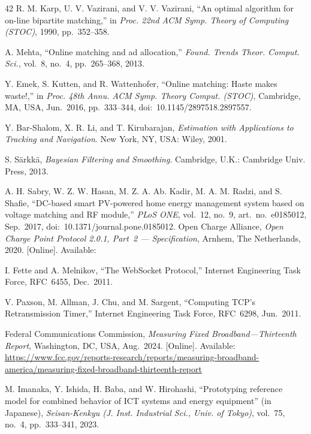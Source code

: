 \documentclass{ieeeaccess}
\newif\ifhighlight \highlightfalse
\DeclareRobustCommand{\revised}[1]{\ifhighlight{\color{blue}#1}\else{\color{.}#1}\fi}
\begin{document}
\begin{thebibliography}{42}
         R. M. Karp, U. V. Vazirani, and V. V. Vazirani, ``An optimal algorithm for on-line bipartite matching,'' in \textit{Proc. 22nd ACM Symp. Theory of Computing (STOC)}, 1990, pp.~352--358.

         A. Mehta, ``Online matching and ad allocation,'' \textit{Found. Trends Theor. Comput. Sci.}, vol.~8, no.~4, pp.~265--368, 2013.

         Y. Emek, S. Kutten, and R. Wattenhofer, ``Online matching: Haste makes waste!,'' in \textit{Proc. 48th Annu. ACM Symp. Theory Comput. (STOC)}, Cambridge, MA, USA, Jun.~2016, pp.~333--344, doi:~10.1145/2897518.2897557.

         Y. Bar-Shalom, X. R. Li, and T. Kirubarajan, \textit{Estimation with Applications to Tracking and Navigation}. New York, NY, USA: Wiley, 2001.

         S. S\"{a}rkk\"{a}, \textit{Bayesian Filtering and Smoothing}. Cambridge, U.K.: Cambridge Univ. Press, 2013.

         \revised{A. H. Sabry, W. Z. W. Hasan, M. Z. A. Ab. Kadir, M. A. M. Radzi, and S. Shafie, ``DC-based smart PV-powered home energy management system based on voltage matching and RF module,'' \textit{PLoS ONE}, vol.~12, no.~9, art.~no.~e0185012, Sep.~2017, doi:~10.1371/journal.pone.0185012.}
         Open Charge Alliance, \textit{Open Charge Point Protocol 2.0.1, Part~2 --- Specification}, Arnhem, The Netherlands, 2020. [Online]. Available: \revised{\urlocpp}

         I. Fette and A. Melnikov, ``The WebSocket Protocol,'' Internet Engineering Task Force, RFC~6455, Dec.~2011.

         V. Paxson, M. Allman, J. Chu, and M. Sargent, ``Computing TCP's Retransmission Timer,'' Internet Engineering Task Force, RFC~6298, Jun.~2011.

         Federal Communications Commission, \textit{Measuring Fixed Broadband---Thirteenth Report}, Washington, DC, USA, Aug.~2024. [Online]. Available: \url{https://www.fcc.gov/reports-research/reports/measuring-broadband-america/measuring-fixed-broadband-thirteenth-report}

         M. Imanaka, Y. Ishida, H. Baba, and W. Hirohashi, ``Prototyping reference model for combined behavior of ICT systems and energy equipment'' (in Japanese), \textit{Seisan-Kenkyu (J. Inst. Industrial Sci., Univ. of Tokyo)}, vol.~75, no.~4, pp.~333--341, 2023.


\end{thebibliography}
\end{document}
